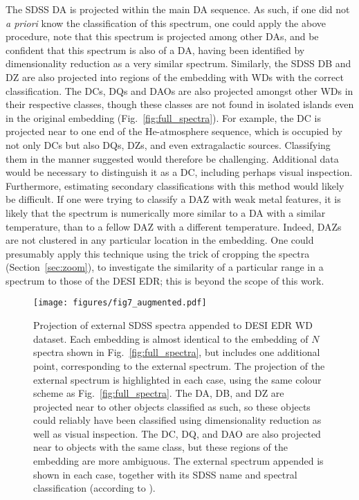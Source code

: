 \documentclass[fleqn,usenatbib]{mnras}
\begin{document}
The SDSS DA is projected within the main DA sequence.
As such, if one did not \textit{a priori} know the classification of this spectrum, one could apply the above procedure, note that this spectrum is projected among other DAs, and be confident that this spectrum is also of a DA, having been identified by dimensionality reduction as a very similar spectrum.
Similarly, the SDSS DB and DZ are also projected into regions of the embedding with WDs with the correct classification.
The DCs, DQs and DAOs are also projected amongst other WDs in their respective classes, though these classes are not found in isolated islands even in the original embedding (Fig.~\ref{fig:full_spectra}).
For example, the DC is projected near to one end of the He-atmosphere sequence, which is occupied by not only DCs but also DQs, DZs, and even extragalactic sources.
Classifying them in the manner suggested would therefore be challenging.
Additional data would be necessary to distinguish it as a DC, including perhaps visual inspection.
Furthermore, estimating secondary classifications with this method would likely be difficult.
If one were trying to classify a DAZ with weak metal features, it is likely that the spectrum is numerically more similar to a DA with a similar temperature, than to a fellow DAZ with a different temperature.
Indeed, DAZs are not clustered in any particular location in the embedding.
One could presumably apply this technique using the trick of cropping the spectra (Section~\ref{sec:zoom}), to investigate the similarity of a particular range in a  spectrum to those of the DESI EDR; this is beyond the scope of this work.

\begin{figure*}
\texttt{[image: figures/fig7\_augmented.pdf]}
\caption{
    Projection of external SDSS spectra appended to DESI EDR WD dataset.
    Each embedding is almost identical to the embedding of $N$ spectra shown in Fig.~\ref{fig:full_spectra}, but includes one additional point, corresponding to the external spectrum.
    The projection of the external spectrum is highlighted in each case, using the same colour scheme as Fig.~\ref{fig:full_spectra}.
    The DA, DB, and DZ are projected near to other objects classified as such, so these objects could reliably have been classified using dimensionality reduction as well as visual inspection.
    The DC, DQ, and DAO are also projected near to objects with the same class, but these regions of the embedding are more ambiguous.
    The external spectrum appended is shown in each case, together with its SDSS name and spectral classification (according to \citealt{gentilefusillo19}).
}
\label{fig:external_spectra}
\end{figure*}
\end{document}

